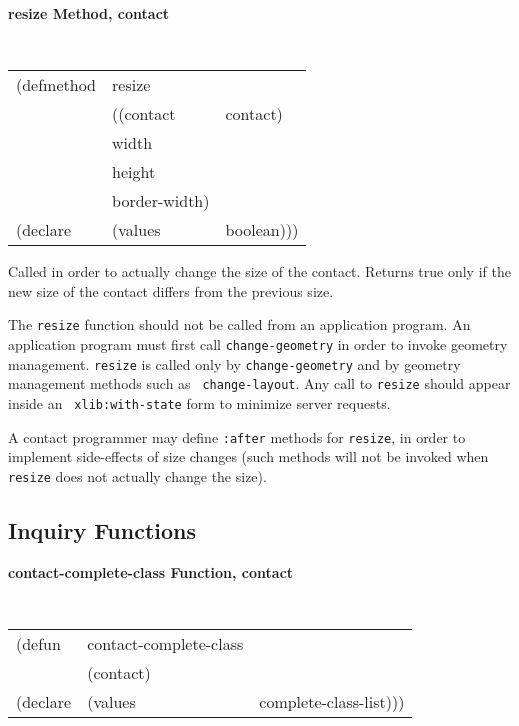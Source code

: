 {\samepage
{\large {\bf resize \hfill Method, contact}}
\begin{flushright}
\parbox[t]{6.125in}{
\tt
\begin{tabular}{lll}
\raggedright
(defmethod & resize & \\
& ((contact  &contact)\\
& width & \\
& height   \\
&border-width)\\
(declare & (values & boolean)))
\end{tabular}
\rm
}\end{flushright}
}

\begin{flushright} \parbox[t]{6.125in}{
Called in order to actually change the size of the contact.
Returns true only if the new size of the contact differs from the previous
size.  

The {\tt resize} function should not be called from an application program.  An
application program must first call {\tt change-geometry}  in order to invoke geometry management.  {\tt resize} is called only by
{\tt change-geometry} and by geometry management methods such as {\tt
change-layout}.  Any call to {\tt resize} should appear inside an {\tt
xlib:with-state} form to minimize server requests.

A contact programmer may define {\tt :after} methods for {\tt resize}, in order to
implement side-effects of size changes (such methods will not be invoked when
{\tt resize} does not actually change the size).

}\end{flushright}

\subsection*{Inquiry Functions}

{\samepage
{\large {\bf contact-complete-class \hfill Function, contact}}
\begin{flushright} \parbox[t]{6.125in}{
\tt
\begin{tabular}{lll}
\raggedright
(defun & contact-complete-class & \\
& (contact) \\
(declare & (values & complete-class-list)))
\end{tabular}
\rm
}\end{flushright}
}

